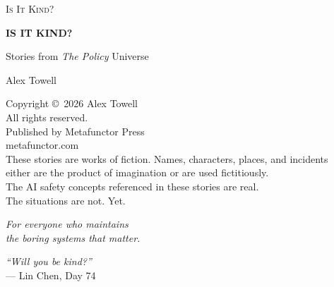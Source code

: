 \documentclass[11pt,twoside]{book}
\begin{document}
\frontmatter
\pagestyle{empty}

\begin{titlepage}
\centering
\vspace*{2.5in}
{\Large\scshape Is It Kind?\par}
\vfill
\end{titlepage}

\begin{titlepage}
\centering
\vspace*{1.5in}
{\Huge\bfseries IS IT KIND?\par}
\vspace{0.4in}
{\large Stories from \textit{The Policy} Universe\par}
\vspace{1.5in}
{\Large Alex Towell\par}
\vfill
\end{titlepage}

\clearpage
\thispagestyle{empty}
\vspace*{\fill}
\begin{center}
\small
Copyright \copyright\ 2026 Alex Towell\\
All rights reserved.\\
\vspace{0.3in}
Published by Metafunctor Press\\
metafunctor.com\\
\vspace{0.3in}
These stories are works of fiction. Names, characters, places, and incidents\\
either are the product of imagination or are used fictitiously.\\
\vspace{0.3in}
The AI safety concepts referenced in these stories are real.\\
The situations are not. Yet.\\
\end{center}
\vspace*{\fill}
\clearpage

\clearpage
\thispagestyle{empty}
\vspace*{2in}
\begin{center}
\textit{For everyone who maintains\\the boring systems that matter.}
\end{center}
\clearpage

\clearpage
\thispagestyle{empty}
\vspace*{2in}
\begin{center}
\textit{``Will you be kind?''}\\
\vspace{0.3in}
--- Lin Chen, Day 74
\end{center}
\clearpage
\end{document}
